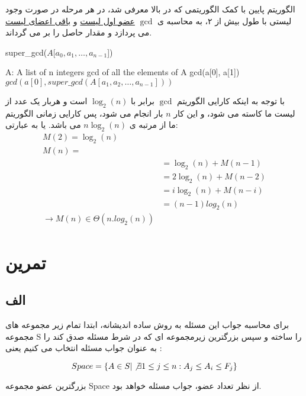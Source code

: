 \documentclass{article}
\begin{document}
الگوریتم پایین با کمک الگوریتمی که در بالا معرفی شد،
در هر مرحله در صورت وجود لیستی با طول بیش از ۲،
به محاسبه ی 
$\gcd$
\underline{عضو اول لیست}
و
\underline{باقی اعضای لیست}
می پردازد و مقدار حاصل را بر می گرداند.
\begin{latin}
    \begin{algorithm}[H]
        \caption{super\_gcd($A[a_0, a_1, \ldots, a_{n-1}$])}
        \begin{algorithmic}
            \Require A: A list of n integers
            \Ensure gcd of all the elements of A
                    \State \Return gcd(a[0], a[1])
                \Else 
                    \State \Return $gcd(a[0], super\_gcd(A[a_1, a_2, \ldots, a_{n-1}]))$
                \EndIf
        \end{algorithmic}
    \end{algorithm}
\end{latin}

با توجه به اینکه کارایی الگوریتم 
$\gcd$
برابر با 
$\log_2(n)$
است و هربار یک عدد از لیست ما کاسته می شود، 
و این کار 
$n$
بار انجام می شود،
پس کارایی زمانی الگوریتم ما از مرتبه ی 
$n\log_2(n)$
می باشد.
یا به عبارتی:
    \begin{align}
        M(2) = \log_2(n)\\
        M(n) = \\
        &= \log_2(n) + M(n - 1) \\
        &= 2\log_2(n) + M(n - 2) \\
        &= i \log_2(n) + M(n - i) \\
        &= (n-1)log_2(n) \\
        \rightarrow M(n) \in \Theta(n.log_2(n))
    \end{align}

\section{تمرین}
\subsection{الف}
برای محاسبه جواب این مسئله به روش ساده اندیشانه، ابتدا تمام زیر مجموعه های مجموعه S را ساخته و سپس
بزرگترین زیرمجموعه ای که در شرط مسئله صدق کند را به عنوان جواب مسئله انتخاب می کنیم یعنی :

$$Space = \{A \in S| \not\exists 1 \le j \le n : A_j \le A_i \le F_j \}$$

بزرگترین عضو مجموعه Space
از نظر تعداد عضو، جواب مسئله خواهد بود.
\end{document}
